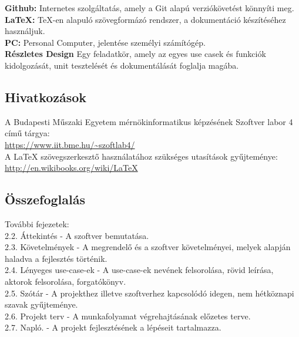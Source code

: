 \noindent\textbf{Github:} Internetes szolgáltatás, amely a Git alapú verziókövetést könnyíti meg.\\

\noindent\textbf{LaTeX:} TeX-en alapuló szövegformázó rendszer, a dokumentáció készítéséhez használjuk.\\

\noindent\textbf{PC:} Personal Computer, jelentése személyi számítógép.\\

\noindent\textbf{Részletes Design} Egy feladatkör, amely az egyes use casek és funkciók
kidolgozását, unit tesztelését és dokumentálását foglalja magába.\\

\subsection{Hivatkozások}

A Budapesti Műszaki Egyetem mérnökinformatikus képzésének Szoftver labor 4 című tárgya:  \\
\url{https://www.iit.bme.hu/~szoftlab4/}\\

A LaTeX szövegszerkesztő használatához szükséges utasítások gyűjteménye:\\
\url{http://en.wikibooks.org/wiki/LaTeX}\\


\subsection{Összefoglalás}

 További fejezetek:\\

 2.2. Áttekintés - A szoftver bemutatása.\\

 2.3. Követelmények - A megrendelő és a szoftver követelményei, melyek alapján haladva a fejlesztés történik.\\

 2.4. Lényeges use-case-ek - A use-case-ek nevének felsorolása, rövid leírása, aktorok felsorolása, forgatókönyv.\\

 2.5. Szótár - A projekthez illetve szoftverhez kapcsolódó idegen, nem hétköznapi szavak gyűjteménye.\\

 2.6. Projekt terv - A munkafolyamat végrehajtásának előzetes terve.\\

 2.7. Napló. - A projekt fejlesztésének a lépéseit tartalmazza.